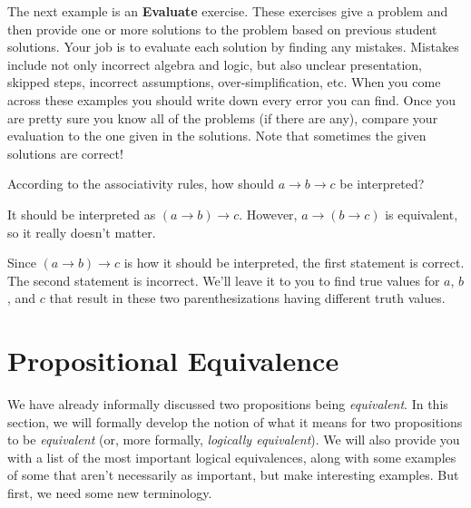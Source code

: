 \vspace*{-.1in} %

\begin{rem}
The next example is an {\bf Evaluate} exercise.  
These exercises give a problem and then provide one or more solutions to the problem 
based on previous student solutions.
Your job is to evaluate each solution by finding any mistakes.  
Mistakes include not only incorrect algebra and logic, but also unclear presentation, 
skipped steps, incorrect assumptions, over-simplification, etc.
When you come across these examples you should write down every error you can find.  Once you are pretty sure you
know all of the problems (if there are any), compare your evaluation to the one given in the solutions.
Note that sometimes the given solutions are correct!
\end{rem}

\vspace*{-.1in} %

\begin{eval}
According to the associativity rules, how should
$a \rightarrow b  \rightarrow c$  be interpreted?
\begin{ssol}
It should be interpreted as $(a \rightarrow b) \rightarrow c$.
However, $a \rightarrow (b \rightarrow c)$ is equivalent, so it really doesn't matter.
\end{ssol}
\evallinetwo
\begin{answer}
Since $(a \rightarrow b) \rightarrow c$ is how it should be interpreted, the first statement is correct.
The second statement is incorrect.  We'll leave it to you to find true values for $a$, $b$, and $c$
that result in these two parenthesizations having different truth values.
\end{answer}
\end{eval}

\vspace*{-.1in} %

\newpage
\section{Propositional Equivalence}\label{section:equiv}
We have already informally discussed two propositions being {\em equivalent}.
In this section, we will formally develop the notion of what it means for
two propositions to be {\em equivalent} (or, more formally,  {\em logically equivalent}).
We will also provide you with a list of the most important logical equivalences,
along with some examples of some that aren't necessarily as important, but make interesting examples.
But first, we need some new terminology.

